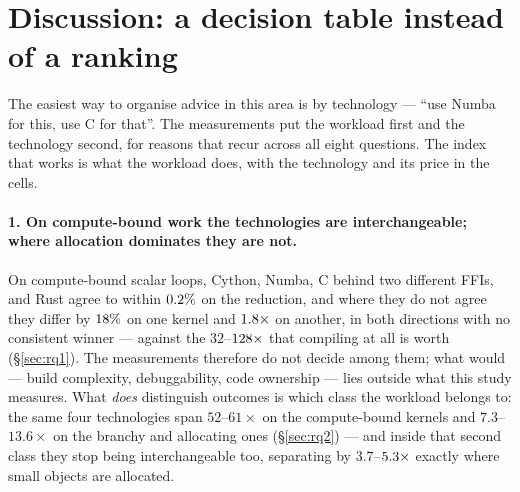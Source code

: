 \section{Discussion: a decision table instead of a ranking}
\label{sec:discussion}

The easiest way to organise advice in this area is by technology --- ``use Numba for this, use C for
that''. The measurements put the workload first and the technology second, for reasons
that recur across all eight questions. The index that works is what the workload does, with the
technology and its price in the cells.

\paragraph{1. On compute-bound work the technologies are interchangeable; where allocation
dominates they are not.} On compute-bound scalar loops, Cython, Numba, C behind two different FFIs, and Rust
agree to within $\meas{pct:b1_compute-314:arraysum/c_ctypes|b1_compute-314:arraysum/numba}{0.2}\%$ on the reduction, and where they do not agree they differ by $\meas{pct:b1_compute-314:mandelbrot/rust_ctypes|b1_compute-314:mandelbrot/cython}{18}\%$ on
one kernel and $\meas{ratio:b1_compute-314:matmul/c_ctypes|b1_compute-314:matmul/numba}{1.8}\times$ on another, in both directions with no consistent winner --- against
the $32$--$\meas{ratio:b1_compute-314:matmul/cpython_loop|b1_compute-314:matmul/numba}{128}\times$ that compiling at all is worth (\S\ref{sec:rq1}). The measurements
therefore do not decide among them; what would --- build complexity, debuggability, code
ownership --- lies outside what this study measures. What \emph{does} distinguish outcomes is which class
the workload belongs to: the same four technologies span $52$--$61\times$ on the compute-bound
kernels and $7.3$--$13.6\times$ on the branchy and allocating ones (\S\ref{sec:rq2}) --- and
inside that second class they stop being interchangeable too, separating by $3.7$--$\meas{ratio:b2_branchy-314:binarytrees/numba|b2_branchy-314:binarytrees/rust_ctypes}{5.3}\times$
exactly where small objects are allocated.

